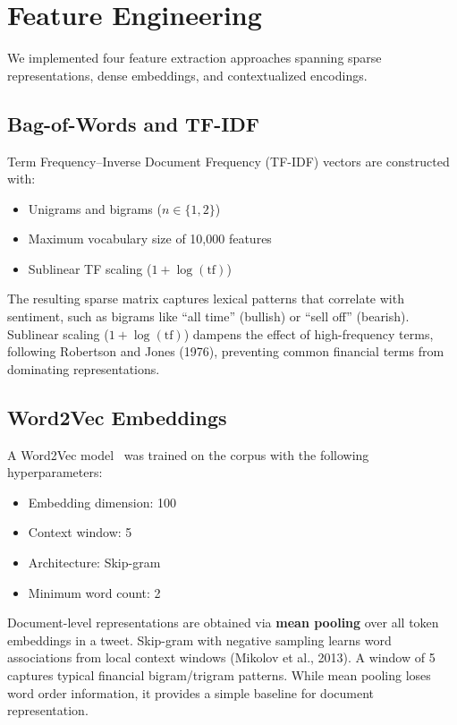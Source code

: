 \documentclass[11pt,a4paper]{article}
\begin{document}
\section{Feature Engineering}

We implemented four feature extraction approaches spanning sparse representations, dense embeddings, and contextualized encodings.

\subsection{Bag-of-Words and TF-IDF}

Term Frequency--Inverse Document Frequency (TF-IDF) vectors are constructed with:
\begin{itemize}[noitemsep]
    \item Unigrams and bigrams ($n \in \{1, 2\}$)
    \item Maximum vocabulary size of 10,000 features
    \item Sublinear TF scaling ($1 + \log(\text{tf})$)
\end{itemize}

The resulting sparse matrix captures lexical patterns that correlate with sentiment, such as bigrams like ``all time'' (bullish) or ``sell off'' (bearish). Sublinear scaling ($1 + \log(\text{tf})$) dampens the effect of high-frequency terms, following Robertson and Jones (1976), preventing common financial terms from dominating representations.

\subsection{Word2Vec Embeddings}

A Word2Vec model~\cite{mikolov2013word2vec} was trained on the corpus with the following hyperparameters:
\begin{itemize}[noitemsep]
    \item Embedding dimension: 100
    \item Context window: 5
    \item Architecture: Skip-gram
    \item Minimum word count: 2
\end{itemize}

Document-level representations are obtained via \textbf{mean pooling} over all token embeddings in a tweet. Skip-gram with negative sampling learns word associations from local context windows (Mikolov et al., 2013). A window of 5 captures typical financial bigram/trigram patterns. While mean pooling loses word order information, it provides a simple baseline for document representation.
\end{document}
